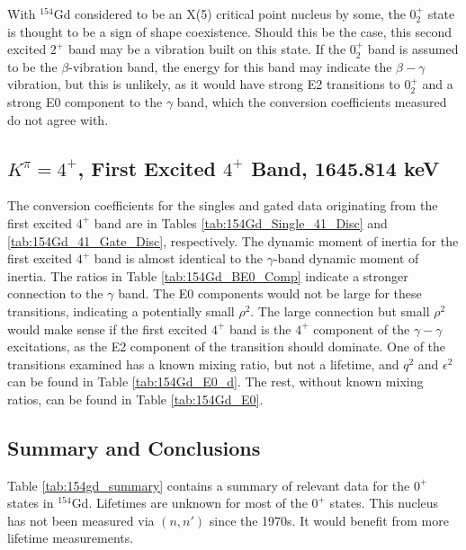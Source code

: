 With $^{154}$Gd considered to be an X(5) critical point nucleus by some, the $0^+_2$ state is thought to be a sign of shape coexistence. Should this be the case, this second excited $2^+$ band may be a vibration built on this state.  If the $0^+_2$ band is assumed to be the $\beta$-vibration band, the energy for this band may indicate the $\beta-\gamma$ vibration, but this is unlikely, as it would have strong E2 transitions to $0^+_2$ and a strong E0 component to the $\gamma$ band, which the conversion coefficients measured do not agree with.





\subsection{$K^{\pi}=4^+$, First Excited $4^+$ Band, 1645.814 keV}

The conversion coefficients for the singles and gated data originating from the first excited $4^+$ band are in Tables \ref{tab:154Gd_Single_41_Disc} and \ref{tab:154Gd_41_Gate_Disc}, respectively. The dynamic moment of inertia for the first excited $4^+$ band is almost identical to the $\gamma$-band dynamic moment of inertia. The ratios in Table \ref{tab:154Gd_BE0_Comp} indicate a stronger connection to the $\gamma$ band. The E0 components would not be large for these transitions, indicating a potentially small $\rho^2$. The large connection but small $\rho^2$ would make sense if the first excited $4^+$ band is the $4^+$ component of the $\gamma-\gamma$ excitations, as the E2 component of the transition should dominate. One of the transitions examined has a known mixing ratio, but not a lifetime, and $q^2$ and $\epsilon^2$ can be found in Table \ref{tab:154Gd_E0_d}. The rest, without known mixing ratios, can be found in Table \ref{tab:154Gd_E0}.





\subsection{Summary and Conclusions}

Table \ref{tab:154gd_summary} contains a summary of relevant data for the $0^+$ states in $^{154}$Gd. Lifetimes are unknown for most of the $0^+$ states. This nucleus has not been measured via $(n,n')$ since the 1970s. It would benefit from more lifetime measurements.


